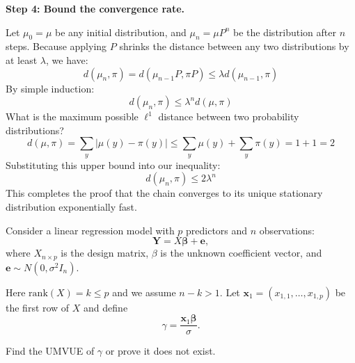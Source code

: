\begin{solution}
\textbf{Step 4: Bound the convergence rate.}

Let $\mu_0 = \mu$ be any initial distribution, and $\mu_n = \mu P^n$ be the distribution after $n$ steps.
Because applying $P$ shrinks the distance between any two distributions by at least $\lambda$, we have:
\[ d(\mu_n, \pi) = d(\mu_{n-1}P, \pi P) \leq \lambda d(\mu_{n-1}, \pi) \]
By simple induction:
\[ d(\mu_n, \pi) \leq \lambda^n d(\mu, \pi) \]
What is the maximum possible $\ell^1$ distance between two probability distributions?
\[ d(\mu, \pi) = \sum_y |\mu(y) - \pi(y)| \leq \sum_y \mu(y) + \sum_y \pi(y) = 1 + 1 = 2 \]
Substituting this upper bound into our inequality:
\[ d(\mu_n, \pi) \leq 2 \lambda^n \]
This completes the proof that the chain converges to its unique stationary distribution exponentially fast.
\end{solution}

\begin{exercise}\label{probability:2021:5}
Consider a linear regression model with $p$ predictors and $n$ observations:
\[
\mathbf{Y} = X\boldsymbol{\beta} + \mathbf{e},
\]
where $X_{n \times p}$ is the design matrix, $\beta$ is the unknown coefficient vector, and $\mathbf{e} \sim N(0, \sigma^2 I_n)$.

Here $\mathrm{rank}(X) = k \leq p$ and we assume $n - k > 1$. Let $\mathbf{x}_1 = (x_{1,1}, \hdots, x_{1,p})$ be the first row of $X$ and define
\[
\gamma = \frac{\mathbf{x}_1\boldsymbol{\beta}}{\sigma}.
\]

Find the UMVUE of $\gamma$ or prove it does not exist.
\end{exercise}

